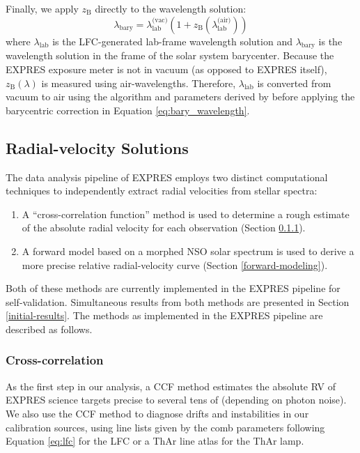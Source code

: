 Finally, we apply \(z_\text{B}\) directly to the wavelength solution:
\begin{equation}
    \lambda_\text{bary} = \lambda_\text{lab}^\text{(vac)} \left(1 + z_\text{B}\left(\lambda_\text{lab}^\text{(air)}\right)\right)
    \label{eq:bary_wavelength}
\end{equation}
where \(\lambda_\text{lab}\) is the LFC-generated lab-frame wavelength solution and \(\lambda_\text{bary}\) is the wavelength solution in the frame of the solar system barycenter. Because the EXPRES exposure meter is not in vacuum (as opposed to EXPRES itself), \(z_\text{B}(\lambda)\) is measured using air-wavelengths. Therefore, \(\lambda_\text{lab}\) is converted from vacuum to air using the algorithm and parameters derived by \citet{ciddor_refractive_1996} before applying the barycentric correction in Equation \ref{eq:bary_wavelength}.

\hypertarget{radial-velocity-solutions}{%
\subsection{Radial-velocity Solutions}\label{radial-velocity-solutions}}

The data analysis pipeline of EXPRES employs two distinct computational techniques to independently extract radial velocities from stellar spectra:
\begin{enumerate}
    \item A ``cross-correlation function'' method \citep[CCF; see][]{baranne_coravel_1979} is used to determine a rough estimate of the absolute radial velocity for each observation (Section \ref{cross-correlation}).
    \item A forward model based on a morphed NSO solar spectrum is used to derive a more precise relative radial-velocity curve (Section \ref{forward-modeling}).
\end{enumerate}
Both of these methods are currently implemented in the EXPRES pipeline for self-validation. Simultaneous results from both methods are presented in Section \ref{initial-results}. The methods as implemented in the EXPRES pipeline are described as follows.

\subsubsection{Cross-correlation}\label{cross-correlation}

As the first step in our analysis, a CCF method estimates the absolute RV of EXPRES science targets precise to several tens of \cms (depending on photon noise). We also use the CCF method to diagnose drifts and instabilities in our calibration sources, using line lists given by the comb parameters following Equation \ref{eq:lfc} for the LFC or a ThAr line atlas for the ThAr lamp.

